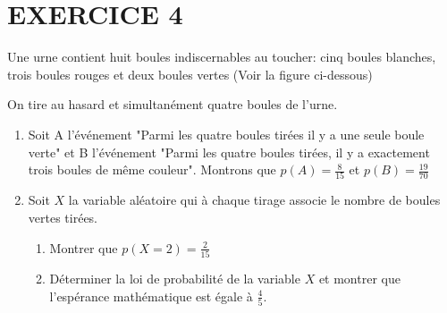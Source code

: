 \documentclass[12pts]{book}
\begin{document}
	\section*{EXERCICE 4}
	Une urne contient huit boules indiscernables au toucher: cinq boules blanches, trois boules rouges et deux boules vertes (Voir la figure ci-dessous)\\
	\begin{center}
	\end{center}
	On tire au hasard et simultanément quatre boules de l'urne.
	\begin{enumerate}
		\item Soit A l'événement "Parmi les quatre boules tirées il y a une seule boule verte" et B l'événement "Parmi les quatre boules tirées, il y a exactement trois boules de même couleur". Montrons que $p(A)=\frac{8}{15}$ et $p(B)=\frac{19}{70}$
		\item Soit $X$ la variable aléatoire qui à chaque tirage associe le nombre de boules vertes tirées.
		\begin{enumerate}
			\item Montrer que $p(X=2)=\frac{2}{15}$
			\item Déterminer la loi de probabilité de la variable $X$ et montrer que l'espérance mathématique est égale à $\frac{4}{5}.$
		\end{enumerate}
	\end{enumerate}

\end{document}
